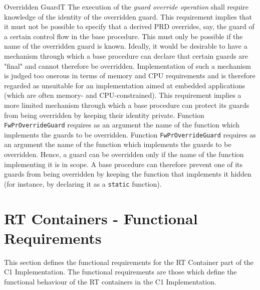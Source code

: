 \documentclass[requirements]{../fwprofile}
\begin{document}
\begin{fw_req_note}{Overridden Guard}{T}
{The execution of the \emph{guard override operation} shall require knowledge of the identity of the overridden guard.}
{This requirement implies that it must not be possible to specify that a derived PRD overrides, say, the guard of a certain control flow in the base procedure. 
This must only be possible if the name of the overridden guard is known.}
{Ideally, it would be desirable to have a mechanism through which a base procedure can declare that certain guards 
are "final" and cannot therefore be overridden. Implementation of such a mechanism is judged too onerous in terms of memory and CPU requirements 
and is therefore regarded as unsuitable for an implementation aimed at embedded applications (which are often memory- and CPU-constrained). 
This requirement implies a more limited mechanism through which a base procedure can protect its guards from being overridden by keeping 
their identity private.}
{Function \texttt{FwPrOverrideGuard} requires as an argument the name of the function which implements the guards to be overridden.} 
{Function \texttt{FwPrOverrideGuard} requires as an argument the name of the function which implements the guards to be overridden. 
Hence, a guard can be overridden only if the name of the function implementing it is in scope. A base procedure can therefore prevent one of its guards 
from being overridden by keeping the function that implements it hidden (for instance, by declaring it as a \texttt{static} function).}
\end{fw_req_note}



\section{RT Containers - Functional Requirements}\label{sec:rtFncReqs}
This section defines the functional requirements for the RT Container part of the C1 Implementation. The functional requirements are those which define the functional behaviour of the RT containers in the C1 Implementation.
\end{document}
